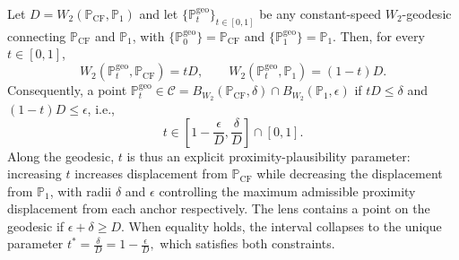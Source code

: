 \begin{proposition}\label{prop:cf-tradeoff}
Let $D
=
W_2(\mathbb{P}_{\mathrm{CF}},\mathbb{P}_1)$
and let $\{\mathbb{P}^{\mathrm{geo}}_t\}_{t\in[0,1]}$ be any constant-speed $W_2$-geodesic connecting $\mathbb{P}_{\mathrm{CF}}$ and $\mathbb{P}_1$, with
$\{\mathbb{P}^{\mathrm{geo}}_0\}=\mathbb{P}_{\mathrm{CF}}$ and $\{\mathbb{P}^{\mathrm{geo}}_1\}=\mathbb{P}_{1}$. Then, for every $t\in[0,1]$, $$W_2(\mathbb{P}^{\mathrm{geo}}_t,\mathbb{P}_{\mathrm{CF}})=tD, \qquad W_2(\mathbb{P}^{\mathrm{geo}}_t,\mathbb{P}_{\mathrm{1}})=(1-t)D.$$
Consequently, a point $\mathbb{P}^{\mathrm{geo}}_t \in \mathcal{C}= B_{W_2}(\mathbb{P}_{\mathrm{CF}},\delta)\cap B_{W_2}(\mathbb{P}_1,\epsilon)$
if $tD\leq\delta$ and $(1-t)D\leq\epsilon$, i.e.,
$$t \in \left[
1-\frac{\epsilon}{D},
\frac{\delta}{D}
\right]
\cap[0,1].$$
Along the geodesic, $t$ is thus an explicit proximity-plausibility parameter: increasing $t$ increases displacement from $\mathbb{P}_{\mathrm{CF}}$ while decreasing the displacement from $\mathbb{P}_1$, with  radii $\delta$ and $\epsilon$ controlling the maximum admissible proximity displacement from each anchor respectively.
The lens contains a point on the geodesic if $\epsilon+\delta \geq D$.
When equality holds, the interval collapses to the unique parameter $t^* =\frac{\delta}{D} = 1- \frac{\epsilon}{D},$
which satisfies both constraints.
\end{proposition}

